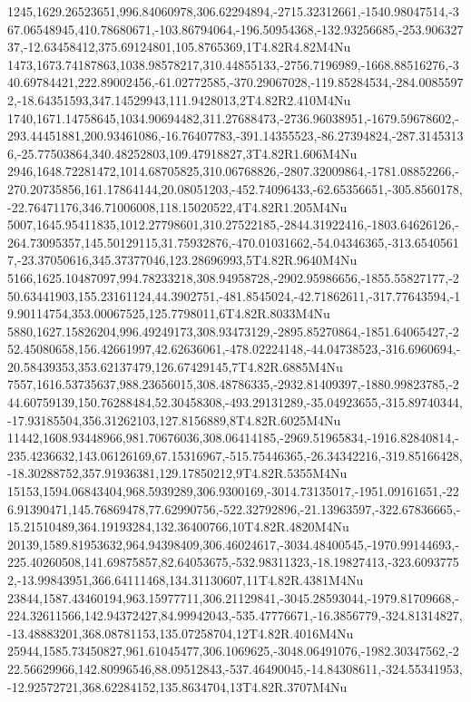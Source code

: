 1245,1629.26523651,996.84060978,306.62294894,-2715.32312661,-1540.98047514,-367.06548945,410.78680671,-103.86794064,-196.50954368,-132.93256685,-253.90632737,-12.63458412,375.69124801,105.8765369,1T4.82R4.82M4Nu
1473,1673.74187863,1038.98578217,310.44855133,-2756.7196989,-1668.88516276,-340.69784421,222.89002456,-61.02772585,-370.29067028,-119.85284534,-284.00855972,-18.64351593,347.14529943,111.9428013,2T4.82R2.410M4Nu
1740,1671.14758645,1034.90694482,311.27688473,-2736.96038951,-1679.59678602,-293.44451881,200.93461086,-16.76407783,-391.14355523,-86.27394824,-287.31453136,-25.77503864,340.48252803,109.47918827,3T4.82R1.606M4Nu
2946,1648.72281472,1014.68705825,310.06768826,-2807.32009864,-1781.08852266,-270.20735856,161.17864144,20.08051203,-452.74096433,-62.65356651,-305.8560178,-22.76471176,346.71006008,118.15020522,4T4.82R1.205M4Nu
5007,1645.95411835,1012.27798601,310.27522185,-2844.31922416,-1803.64626126,-264.73095357,145.50129115,31.75932876,-470.01031662,-54.04346365,-313.65405617,-23.37050616,345.37377046,123.28696993,5T4.82R.9640M4Nu
5166,1625.10487097,994.78233218,308.94958728,-2902.95986656,-1855.55827177,-250.63441903,155.23161124,44.3902751,-481.8545024,-42.71862611,-317.77643594,-19.90114754,353.00067525,125.7798011,6T4.82R.8033M4Nu
5880,1627.15826204,996.49249173,308.93473129,-2895.85270864,-1851.64065427,-252.45080658,156.42661997,42.62636061,-478.02224148,-44.04738523,-316.6960694,-20.58439353,353.62137479,126.67429145,7T4.82R.6885M4Nu
7557,1616.53735637,988.23656015,308.48786335,-2932.81409397,-1880.99823785,-244.60759139,150.76288484,52.30458308,-493.29131289,-35.04923655,-315.89740344,-17.93185504,356.31262103,127.8156889,8T4.82R.6025M4Nu
11442,1608.93448966,981.70676036,308.06414185,-2969.51965834,-1916.82840814,-235.4236632,143.06126169,67.15316967,-515.75446365,-26.34342216,-319.85166428,-18.30288752,357.91936381,129.17850212,9T4.82R.5355M4Nu
15153,1594.06843404,968.5939289,306.9300169,-3014.73135017,-1951.09161651,-226.91390471,145.76869478,77.62990756,-522.32792896,-21.13963597,-322.67836665,-15.21510489,364.19193284,132.36400766,10T4.82R.4820M4Nu
20139,1589.81953632,964.94398409,306.46024617,-3034.48400545,-1970.99144693,-225.40260508,141.69875857,82.64053675,-532.98311323,-18.19827413,-323.60937752,-13.99843951,366.64111468,134.31130607,11T4.82R.4381M4Nu
23844,1587.43460194,963.15977711,306.21129841,-3045.28593044,-1979.81709668,-224.32611566,142.94372427,84.99942043,-535.47776671,-16.3856779,-324.81314827,-13.48883201,368.08781153,135.07258704,12T4.82R.4016M4Nu
25944,1585.73450827,961.61045477,306.1069625,-3048.06491076,-1982.30347562,-222.56629966,142.80996546,88.09512843,-537.46490045,-14.84308611,-324.55341953,-12.92572721,368.62284152,135.8634704,13T4.82R.3707M4Nu

